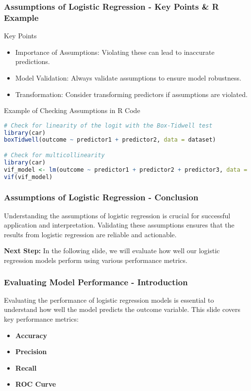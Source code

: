 \documentclass[aspectratio=169]{beamer}
\begin{document}
\begin{frame}[fragile]
    \frametitle{Assumptions of Logistic Regression - Key Points & R Example}
    \begin{block}{Key Points}
        \begin{itemize}
            \item Importance of Assumptions: Violating these can lead to inaccurate predictions.
            \item Model Validation: Always validate assumptions to ensure model robustness.
            \item Transformation: Consider transforming predictors if assumptions are violated.
        \end{itemize}
    \end{block}

    \begin{block}{Example of Checking Assumptions in R Code}
        \begin{lstlisting}[language=R]
# Check for linearity of the logit with the Box-Tidwell test
library(car)
boxTidwell(outcome ~ predictor1 + predictor2, data = dataset)

# Check for multicollinearity 
library(car)
vif_model <- lm(outcome ~ predictor1 + predictor2 + predictor3, data = dataset)
vif(vif_model)
        \end{lstlisting}
    \end{block}
\end{frame}

\begin{frame}[fragile]
    \frametitle{Assumptions of Logistic Regression - Conclusion}
    Understanding the assumptions of logistic regression is crucial for successful application and interpretation. Validating these assumptions ensures that the results from logistic regression are reliable and actionable.
    
    \textbf{Next Step:} In the following slide, we will evaluate how well our logistic regression models perform using various performance metrics.
\end{frame}

\begin{frame}[fragile]
    \frametitle{Evaluating Model Performance - Introduction}
    Evaluating the performance of logistic regression models is essential to understand how well the model predicts the outcome variable. This slide covers key performance metrics:
    \begin{itemize}
        \item \textbf{Accuracy}
        \item \textbf{Precision}
        \item \textbf{Recall}
        \item \textbf{ROC Curve}
    \end{itemize}
\end{frame}
\end{document}
